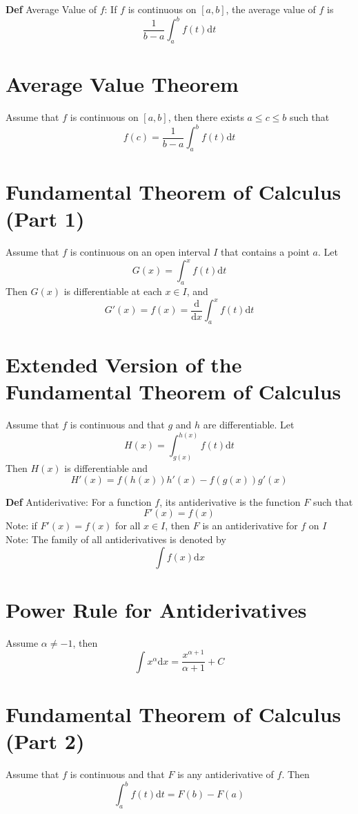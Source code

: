 \documentclass[11pt,notitlepage]{report}
\begin{document}
\textbf{Def} Average Value of $f$: If $f$ is continuous on $[a, b]$, the average value of $f$ is
$$\frac{1}{b-a} \int_a^b f(t) \mathrm{d}t$$

\section{Average Value Theorem}Assume that $f$ is continuous on $[a, b]$, then there exists $a \leq c \leq b$ such that
$$f(c) = \frac{1}{b-a}\int_a^b f(t) \mathrm{d}t$$

\section{Fundamental Theorem of Calculus (Part 1)}Assume that $f$ is continuous on an open interval $I$ that contains a point $a$. Let $$G(x) = \int_a^xf(t)\mathrm{d}t$$ Then $G(x)$ is differentiable at each $x \in I$, and
$$G'(x) = f(x) = \frac{\mathrm{d}}{\mathrm{d}x}\int_a^xf(t)\mathrm{d}t$$

\section{Extended Version of the Fundamental Theorem of Calculus}Assume that $f$ is continuous and that $g$ and $h$ are differentiable. Let $$H(x) = \int_{g(x)}^{h(x)}f(t)\mathrm{d}t$$ Then $H(x)$ is differentiable and
$$H'(x) = f( h(x) )h'(x) - f( g(x) )g'(x)$$

\textbf{Def} Antiderivative: For a function $f$, its antiderivative is the function $F$ such that
$$F'(x) = f(x)$$
\hspace*{5mm} Note: if $F'(x) = f(x)$ for all $x \in I$, then $F$ is an antiderivative for $f$ on $I$\\
\hspace*{5mm} Note: The family of all antiderivatives is denoted by $$\int f(x) \mathrm{d}x$$

\section{Power Rule for Antiderivatives}Assume $\alpha \ne -1$, then $$\int x^\alpha \mathrm{d}x = \frac{x^{\alpha+1}}{\alpha+1} + C$$

\section{Fundamental Theorem of Calculus (Part 2)}Assume that $f$ is continuous and that $F$ is any antiderivative of $f$. Then
$$\int_a^b f(t) \mathrm{d} t = F(b) - F(a)$$
\end{document}
